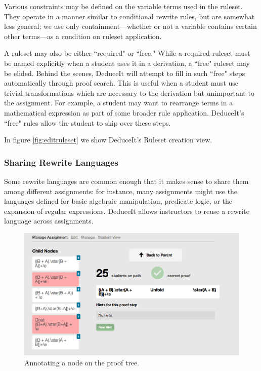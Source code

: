 \documentclass{sigchi}
\begin{document}
Various constraints may be defined on the variable terms used in the ruleset. They operate in a manner similar to conditional rewrite rules, but are somewhat less general; we use only containment---whether or not a variable contains certain other terms---as a condition on ruleset application.

A ruleset may also be either ``required" or ``free." While a required ruleset must be named explicitly when a student uses it in a derivation, a ``free" ruleset may be elided. Behind the scenes, DeduceIt will attempt to fill in such ``free" steps automatically through proof search. This is useful when a student must use trivial transformations which are necessary to the derivation but unimportant to the assignment. For example, a student may want to rearrange terms in a mathematical expression as part of some broader rule application. DeduceIt's ``free" rules allow the student to skip over these steps.  

In figure \ref{fig:editruleset} we show DeduceIt's Ruleset creation view.

\subsubsection{Sharing Rewrite Languages}

Some rewrite languages are common enough that it makes sense to share them among different assignments: for instance, many assignments might use the languages defined for basic algebraic manipulation, predicate logic, or the expansion of regular expressions. DeduceIt allows instructors to reuse a rewrite language across assignments.

\begin{figure}[!h]
\centering
\includegraphics[width=1\columnwidth]{nodeannote}
\caption{Annotating a node on the proof tree.}
\label{fig:nodeannote}
\end{figure}
\end{document}
